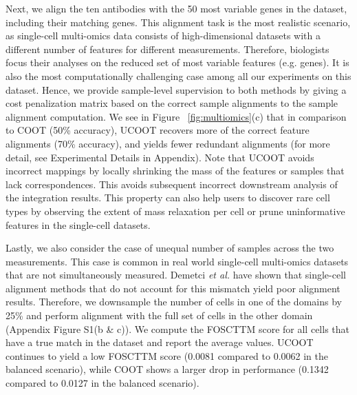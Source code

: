 Next, we align the ten antibodies with
the 50 most variable genes in the dataset, including their matching genes.
This alignment task is the most realistic scenario, as single-cell multi-omics data
consists of high-dimensional datasets with a different number of features for different measurements.
Therefore, biologists focus their analyses on the reduced set of most variable features (e.g. genes).
It is also the most computationally challenging case among all our experiments on this dataset.
Hence, we provide sample-level supervision to both methods by giving a cost penalization matrix
based on the correct sample alignments to the sample alignment computation.
We see in Figure ~\ref{fig:multiomics}(c) that in comparison to COOT (50\% accuracy),
UCOOT recovers more of the correct feature alignments (70\% accuracy),
and yields fewer redundant alignments  (for more detail, see Experimental Details in Appendix).
Note that UCOOT avoids incorrect mappings by locally shrinking the mass of the features or samples
that lack correspondences. This avoids subsequent incorrect downstream analysis of
the integration results. This property can also help users to discover rare cell types
by observing the extent of mass relaxation per cell or prune uninformative features in
the single-cell datasets.


Lastly, we also consider the case of unequal number of samples across the two measurements.
This case is common in real world single-cell multi-omics datasets that are not
simultaneously measured. Demetci \textit{et al.} \citep{Demetci22-2} have shown that
single-cell alignment methods that do not account for this mismatch yield poor alignment results.
Therefore, we downsample the number of cells in one of the domains by 25\%
and perform alignment with the full set of cells in the other domain (Appendix Figure S1(b \& c)).
We compute the FOSCTTM score for all cells that have a true match in the dataset and
report the average values. UCOOT continues to yield a low FOSCTTM score (0.0081 compared to 0.0062
in the balanced scenario), while COOT shows a larger drop in performance
(0.1342 compared to 0.0127 in the balanced scenario).

